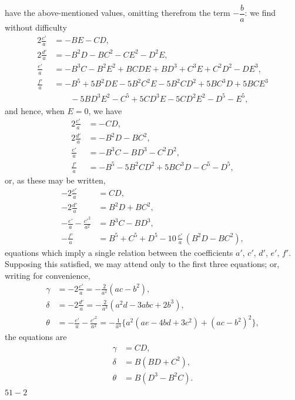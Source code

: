 \documentclass[11pt]{article}
\begin{document}
have the above-mentioned values, omitting therefrom the term $-\dfrac{b}{a}$:
we find without difficulty
\begin{align*}
  2\frac{c'}{a} &= - BE - CD,\\
  2\frac{d'}{a} &= - B^{2} D - BC^{2} - CE^{2} - D^{2} E,\\
  \frac{e'}{a} &= - B^{3} C - B^{2} E^{2} + BCDE + BD^{3} + C^{3} E + C^{2} D^{2} - DE^{3},\\
  \frac{f'}{a} &= - B^{5} + 5 B^{2} D E - 5 B^{2} C^{2} E - 5 B^{2} C D^{2} + 5 B C^{3} D + 5 B C E^{3}\\
        &\qquad - 5 B D^{3} E^{2} - C^{5} + 5 C D^{3} E - 5 C D^{2} E^{2} - D^{5} - E^{5},
\end{align*}
and hence, when $E = 0$, we have
\begin{align*}
  2\frac{c'}{a} &= - CD,\\
  2\frac{d'}{a} &= - B^{2} D - BC^{2},\\
  \frac{e'}{a} &= - B^{3} C - BD^{3} - C^{2} D^{2},\\
  \frac{f'}{a} &= - B^{5} - 5 B^{2} C D^{2} + 5 B C^{3} D - C^{5} - D^{5},
\end{align*}
or, as these may be written,
\begin{align*}
  - 2 \tfrac{c'}{a} &= CD,\\
  - 2 \tfrac{d'}{a} &= B^{2} D + BC^{2},\\
  - \tfrac{e'}{a} - \tfrac{c'^{2}}{a^{2}} &= B^{3} C - BD^{3},\\
  - \tfrac{f'}{a} &= B^{5} + C^{5} + D^{5} - 10\,\tfrac{c'}{a}\,(B^{2} D - BC^{2}),
\end{align*}
equations which imply a single relation between the coefficients $a',\,c',\,d',\,e',\,f'$.
Supposing this satisfied, we may attend only to the first three equations; or, writing
for convenience,
\begin{align*}
  \gamma &= - 2\tfrac{c'}{a} = -\tfrac{2}{a^{2}}(ac - b^{2}),\\
  \delta &= - 2\tfrac{d'}{a} = -\tfrac{2}{a^{3}}(a^{2} d - 3 a b c + 2 b^{3}),\\
  \theta &= -\tfrac{e'}{a} - \tfrac{c'^{2}}{a^{2}}
          = -\tfrac{1}{a^{4}}\bigl\{a^{2}(ae - 4 b d + 3 c^{2}) + (ac - b^{2})^{2}\bigr\},
\end{align*}
the equations are
\begin{align*}
  \gamma &= CD,\\
  \delta &= B(BD + C^{2}),\\
  \theta &= B(D^{3} - B^{2} C).
\end{align*}
\hfill $51{-}2$
\end{document}
